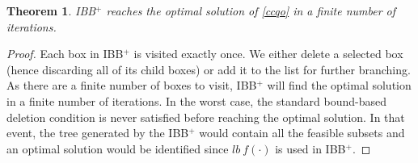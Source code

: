 \documentclass[10pt,a4paper]{amsart}
\newtheorem{theorem}{Theorem}
\begin{document}
\begin{theorem}
\textup{IBB$^{+}$} reaches the optimal solution of \eqref{ccqo} in a finite number of iterations.
\end{theorem}

\begin{proof}
Each box in IBB$^{+}$ is visited exactly once. We either delete a selected box (hence discarding all of its child boxes) or add it to the list for further branching. As there are a finite number of boxes to visit, IBB$^{+}$ will find the optimal solution in a finite number of iterations. In the worst case, the standard bound-based deletion condition is never satisfied before reaching the optimal solution. In that event, the tree generated by the IBB$^{+}$ would contain all the feasible subsets and an optimal solution would be identified since $lb \> f(\cdot)$ is used in IBB$^{+}$. 
\end{proof}
\end{document}
